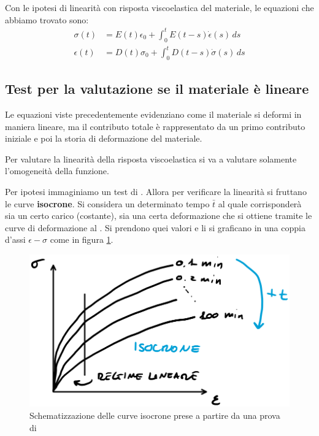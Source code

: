Con le ipotesi di linearità con risposta viscoelastica del materiale,
le equazioni che abbiamo trovato sono:
\begin{align}
\sigma(t) &= E(t)\epsilon_0 + \int_0^t{E(t-s)\dot{\epsilon}(s)\,ds} \label{eqn:RilassamentoComp}\\
\epsilon(t) &= D(t)\sigma_0 + \int_0^t{D(t-s)\dot{\sigma}(s)\,ds}\label{eqn:CreepCompleto}
\end{align}

\subsection{Test per la valutazione se il materiale è lineare}
Le equazioni viste precedentemente evidenziano come il materiale si deformi in maniera lineare, ma il contributo totale è rappresentato da un primo contributo iniziale e poi la storia di deformazione del materiale.

Per valutare la linearità della risposta viscoelastica si va a valutare solamente l'omogeneità della funzione.

Per ipotesi immaginiamo un test di . Allora per verificare la linearità si fruttano le curve \textbf{isocrone}. 
Si considera un determinato tempo $\bar{t}$ al quale corrisponderà sia un certo carico (costante), sia una certa deformazione che si ottiene tramite le curve di deformazione al . Si prendono quei valori e li si graficano in una coppia d'assi $\epsilon-\sigma$ come in figura \ref{fig:Isocrone}.

\begin{figure}
\centering
\includegraphics[width = \textwidth]{gfx/Isocrone}
\caption{Schematizzazione delle curve isocrone prese a partire da una prova di }
\label{fig:Isocrone}
\end{figure}

